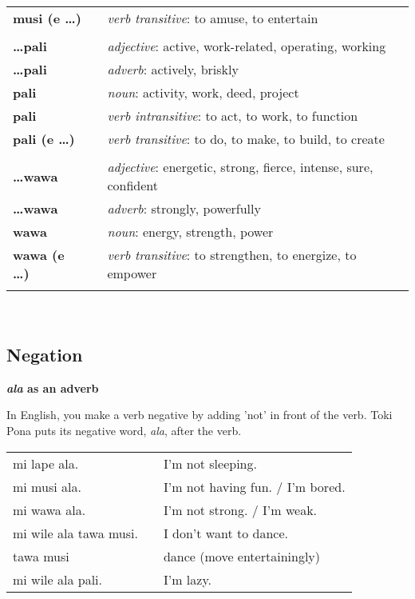 \begin{supertabular}{p{2,5cm}|ll}
\textbf{musi (e \dots)} && \textit{verb transitive}: to amuse, to entertain \\ %
 && \\ %
\textbf{\dots pali} && \textit{adjective}: active, work-related, operating, working \\ %
\textbf{\dots pali} && \textit{adverb}: actively, briskly \\ %
\textbf{pali} && \textit{noun}: activity, work, deed, project \\ %
\textbf{pali} && \textit{verb intransitive}: to act, to work, to function \\ %
\textbf{pali (e \dots)} && \textit{verb transitive}: to do, to make, to build, to create \\ %
 && \\ %
\textbf{\dots wawa} && \textit{adjective}: energetic, strong, fierce, intense, sure, confident \\ %
\textbf{\dots wawa} && \textit{adverb}: strongly, powerfully \\ %
\textbf{wawa} && \textit{noun}: energy, strength, power \\ %
\textbf{wawa (e \dots)} && \textit{verb transitive}: to strengthen, to energize, to empower \\ %
 && \\ %
\end{supertabular} \\
%
\subsection*{Negation}
%
\textbf{\textit{ala} as an adverb}

In English, you make a verb negative by adding 'not' in front of the verb.
Toki Pona puts its negative word, \textit{ala}, after the verb. 

\begin{supertabular}{p{5,5cm}|ll}
mi lape ala. && I'm not sleeping. \\ 
mi musi ala. && I'm not having fun. / I'm bored. \\
mi wawa ala. && I'm not strong. / I'm weak. \\
mi wile ala tawa musi. && I don't want to dance. \\
tawa musi && dance (move entertainingly) \\
mi wile ala pali. && I'm lazy. \\
\end{supertabular} 

